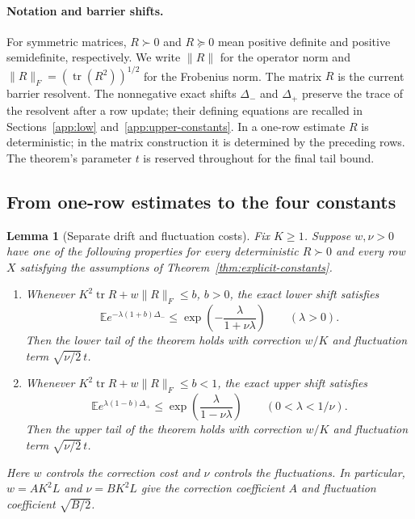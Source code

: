 \documentclass[11pt,a4paper]{article}
\newcommand{\tr}{\operatorname{tr}}
\newcommand{\E}{\mathbb E}
\numberwithin{equation}{section}
\newtheorem{lemma}[theorem]{Lemma}
\begin{document}
\paragraph{Notation and barrier shifts.}
For symmetric matrices, $R\succ0$ and $R\succeq0$ mean positive definite and
positive semidefinite, respectively. We write $\|R\|$ for the operator norm
and $\|R\|_F=(\operatorname{tr}(R^2))^{1/2}$ for the Frobenius norm.
The matrix $R$ is the current barrier resolvent. The nonnegative exact shifts
$\Delta_-$ and $\Delta_+$ preserve the trace of the resolvent after a row update;
their defining equations are recalled in Sections~\ref{app:low}
and~\ref{app:upper-constants}. In a one-row estimate $R$ is deterministic;
in the matrix construction it is determined by the preceding rows.
The theorem's parameter $t$ is reserved throughout for the final tail bound.

\subsection{From one-row estimates to the four constants}
\label{app:transfer}

\begin{lemma}[Separate drift and fluctuation costs]\label{lem:app-transfer}
Fix $K\ge1$. Suppose $w,\nu>0$ have one of the following properties
for every deterministic $R\succ0$ and every row $X$ satisfying the
assumptions of Theorem~\ref{thm:explicit-constants}.
\begin{enumerate}
\item Whenever $K^2\tr R+w\|R\|_F\le b$, $b>0$, the exact lower shift satisfies
\[
 \E e^{-\lambda(1+b)\Delta_-}
 \le \exp\!\left(-\frac{\lambda}{1+\nu\lambda}\right)
 \qquad(\lambda>0).
\]
Then the lower tail of the theorem holds with correction $w/K$ and
fluctuation term $\sqrt{\nu/2}\,t$.
\item Whenever $K^2\tr R+w\|R\|_F\le b<1$, the exact upper shift satisfies
\[
 \E e^{\lambda(1-b)\Delta_+}
 \le \exp\!\left(\frac{\lambda}{1-\nu\lambda}\right)
 \qquad(0<\lambda<1/\nu).
\]
Then the upper tail of the theorem holds with correction $w/K$ and
fluctuation term $\sqrt{\nu/2}\,t$.
\end{enumerate}
Here $w$ controls the correction cost and $\nu$ controls the fluctuations.
In particular, $w=A K^2L$ and $\nu=B K^2L$ give the
correction coefficient $A$ and fluctuation coefficient $\sqrt{B/2}$.
\end{lemma}
\end{document}
